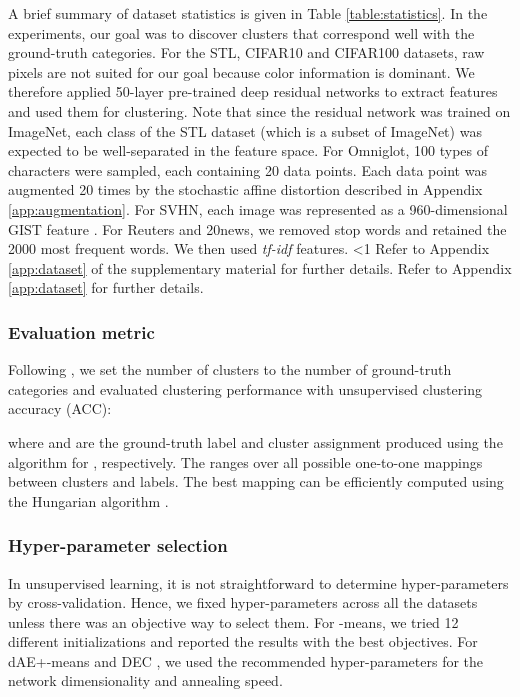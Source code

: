 \documentclass{article}
\theoremstyle{plain}
\newcounter{long}
\begin{document}
A brief summary of dataset statistics is given in Table \ref{table:statistics}.
In the experiments, our goal was to discover clusters that correspond well with the ground-truth categories.
For the STL, CIFAR10 and CIFAR100 datasets, raw pixels are not suited for our goal because color information is dominant.
We therefore applied 50-layer pre-trained deep residual networks \citep{he2016deep} to extract features and used them for clustering. Note that since the residual network was trained on ImageNet, each class of the STL dataset (which is a subset of ImageNet) was expected to be well-separated in the feature space. 
For Omniglot, 100 types of characters were sampled, each containing 20 data points. Each data point was augmented 20 times by the stochastic affine distortion described in Appendix \ref{app:augmentation}.
For SVHN, each image was represented as a 960-dimensional GIST feature \citep{oliva2001modeling}.
For Reuters and 20news, we removed stop words and retained the 2000 most frequent words. We then used {\it tf-idf} features.
\ifnum\value{long}<1
Refer to Appendix \ref{app:dataset} of the supplementary material for further details. 
\else
Refer to Appendix \ref{app:dataset} for further details.
\fi

\subsubsection{Evaluation metric}
Following \citet{xie2016unsupervised}, we set the number of clusters to the number of ground-truth categories and evaluated clustering performance with unsupervised clustering accuracy (ACC):  

where  and  are the ground-truth label and cluster assignment produced using the algorithm for , respectively. The  ranges over all possible one-to-one mappings between clusters and labels. The best mapping can be efficiently computed using the Hungarian algorithm \citep{kuhn1955hungarian}.

\subsubsection{Hyper-parameter selection} \label{sec:hyper_clustering}










In unsupervised learning, it is not straightforward to determine hyper-parameters by cross-validation. 
Hence, we fixed hyper-parameters across all the datasets unless there was an objective way to select them. 
For -means, we tried 12 different initializations and reported the results with the best objectives.
For dAE+-means and DEC \citep{xie2016unsupervised}, we used the recommended hyper-parameters for the network dimensionality and annealing speed.
\end{document}

